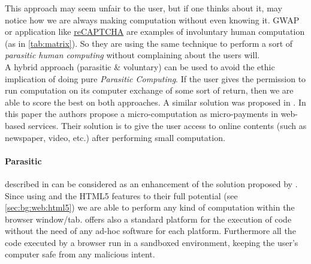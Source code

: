 This approach may seem unfair to the user, but
if one thinks about it, may notice how we are always making computation without even
knowing it. \ac{GWAP} or application like \href{http://www.google.com/recaptcha}{reCAPTCHA}
are examples of involuntary human computation (as in \autoref{tab:matrix}). So
they are using the same technique to perform a sort of \emph{parasitic human
computing} without complaining about the users will.\\

A hybrid approach (parasitic \& voluntary) can be used to avoid the ethic implication
of doing pure \emph{Parasitic Computing}. If the user gives the permission to
run computation on its computer exchange of some sort of return, then we are
able to score the best on both approaches. A similar solution was proposed in
\cite{karame2011pay}.
In this paper the authors propose a micro-computation as micro-payments in web-based
services. Their solution is to give the user access to online contents (such as
newspaper, video, etc.) after performing small \js{} computation.

\paragraph{Parasitic \js{}} described in \cite{jenkin2008parasitic} can be
considered as an enhancement of the solution proposed by \cite{barabasi2001parasitic}.
Since using \js{} and the HTML5 features to their full potential (see
\ref{sec:bg:web:html5}) we are able to perform any kind of computation
within the browser window/tab. \js{} offers also a standard platform for the
execution of code without the need of any ad-hoc software for each platform.
Furthermore all the code executed by a browser run in a sandboxed environment,
keeping the user's computer safe from any malicious intent.